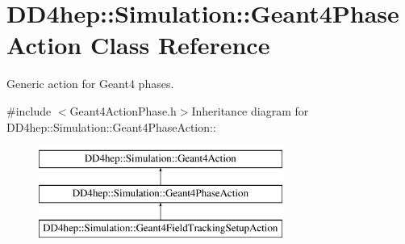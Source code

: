 \hypertarget{class_d_d4hep_1_1_simulation_1_1_geant4_phase_action}{
\section{DD4hep::Simulation::Geant4PhaseAction Class Reference}
\label{class_d_d4hep_1_1_simulation_1_1_geant4_phase_action}
}


Generic action for Geant4 phases.  


{\ttfamily \#include $<$Geant4ActionPhase.h$>$}Inheritance diagram for DD4hep::Simulation::Geant4PhaseAction::\begin{figure}[H]
\begin{center}
\leavevmode
\includegraphics[height=3cm]{class_d_d4hep_1_1_simulation_1_1_geant4_phase_action}
\end{center}
\end{figure}
